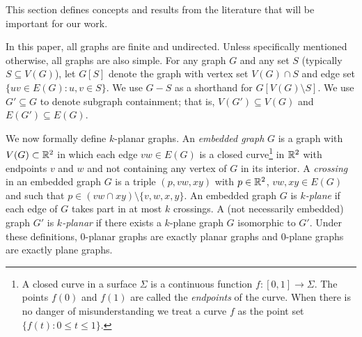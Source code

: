 \documentclass{patmorin}
\renewcommand{\le}{\leqslant}
\begin{document}
This section defines concepts and results from the literature that will be important for our work. 

In this paper, all graphs are finite and undirected. Unless specifically mentioned otherwise, all graphs are also simple. For any graph $G$ and any set $S$ (typically $S\subseteq V(G)$), let $G[S]$  denote the graph with vertex set $V(G)\cap S$ and edge set $\{uv\in E(G) : u,v\in S\}$.  We use $G-S$ as a shorthand for $G[V(G)\setminus S]$. We use $G'\subseteq G$ to denote subgraph containment; that is, $V(G')\subseteq V(G)$ and $E(G')\subseteq E(G)$.

We now formally define $k$-planar graphs.  An \emph{embedded graph} $G$ is a graph with $V(G)\subset\mathbb{R}^2$ in which each edge $vw\in E(G)$ is a closed curve\footnote{A closed curve in a surface $\Sigma$ is a continuous function $f:[0,1]\to \Sigma$. The points $f(0)$ and $f(1)$ are called the \emph{endpoints} of the curve.  When there is no danger of misunderstanding we treat a curve $f$ as the point set $\{f(t):0\le t\le 1\}$.} in $\mathbb{R}^2$ with endpoints $v$ and $w$ and not containing any vertex of $G$ in its interior.  A \emph{crossing} in an embedded graph $G$ is a triple $(p,vw,xy)$ with $p\in\mathbb{R}^2$, $vw,xy\in E(G)$ and such that $p\in (vw\cap xy)\setminus\{v,w,x,y\}$. An embedded graph $G$ is \emph{$k$-plane} if each edge of $G$ takes part in at most $k$ crossings.  A (not necessarily embedded) graph $G'$ is \emph{$k$-planar} if there exists a $k$-plane graph $G$ isomorphic to $G'$.  Under these definitions, $0$-planar graphs are exactly planar graphs and $0$-plane graphs are exactly plane graphs. 
\end{document}
